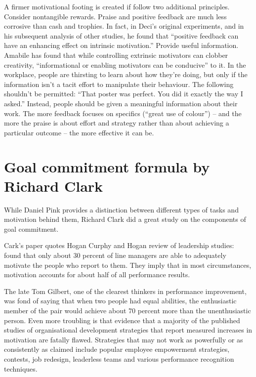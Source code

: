 \begin{compactitem}
A firmer motivational footing is created if follow two additional principles.
\subitem Consider nontangible rewards. Praise and positive feedback are much less corrosive than cash and trophies. In fact, in Deci’s original experiments, and in his subsequent analysis of other studies, he found that ``positive feedback can have an enhancing effect on intrinsic motivation.''
\subitem Provide useful information. Amabile has found that while controlling extrinsic motivators can clobber creativity, ``informational or enabling motivators can be conducive'' to it. In the workplace, people are thirsting to learn about how they’re doing, but only if the information isn’t a tacit effort to manipulate their behaviour. The following shouldn't be permitted: ``That poster was perfect. You did it exactly the way I asked.'' Instead, people should be given a meaningful information about their work. The more feedback focuses on specifics (``great use of colour'') -- and the more the praise is about effort and strategy rather than about achieving a particular outcome -- the more effective it can be.
\end{compactitem}

\section{Goal commitment formula by Richard Clark}

While Daniel Pink provides a distinction between different types of tasks and motivation behind them, Richard Clark did a great study on the components of goal commitment. 

Cark's paper quotes Hogan Curphy and Hogan review of leadership studies: found that only about 30 percent of line managers are able to adequately motivate the people who report to them. They imply that in most circumstances, motivation accounts for about half of all performance results.

The late Tom Gilbert, one of the clearest thinkers in performance improvement, was fond of saying that when two people had equal abilities, the enthusiastic member of the pair would achieve about 70 percent more than the unenthusiastic person. Even more troubling is that evidence that a majority of the published studies of organisational development strategies that report measured increases in motivation are fatally flawed. Strategies that may not work as powerfully or as consistently as claimed include popular employee empowerment strategies, contests, job redesign, leaderless teams and various performance recognition techniques.

